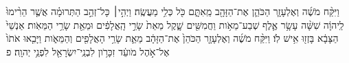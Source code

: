 \documentclass{openreader}
\begin{document}
וַיִּקַּ֨ח מֹשֶׁ֜ה וְאֶלְעָזָ֧ר הַכֹּהֵ֛ן אֶת־הַזָּהָ֖ב מֵֽאִתָּ֑ם כֹּ֖ל כְּלִ֥י מַעֲשֶֽׂה׃ 
וַיְהִ֣י׀ כָּל־זְהַ֣ב הַתְּרוּמָ֗ה אֲשֶׁ֤ר הֵרִ֨ימוּ֙ לַֽיהוָ֔ה שִׁשָּׁ֨ה עָשָׂ֥ר אֶ֛לֶף שְׁבַע־מֵאֹ֥ות וַחֲמִשִּׁ֖ים שָׁ֑קֶל מֵאֵת֙ שָׂרֵ֣י הָֽאֲלָפִ֔ים וּמֵאֵ֖ת שָׂרֵ֥י הַמֵּאֹֽות׃ 
אַנְשֵׁי֙ הַצָּבָ֔א בָּזְז֖וּ אִ֥ישׁ לֹֽו׃ 
וַיִּקַּ֨ח מֹשֶׁ֜ה וְאֶלְעָזָ֤ר הַכֹּהֵן֙ אֶת־הַזָּהָ֔ב מֵאֵ֛ת שָׂרֵ֥י הָאֲלָפִ֖ים וְהַמֵּאֹ֑ות וַיָּבִ֤אוּ אֹתֹו֙ אֶל־אֹ֣הֶל מֹועֵ֔ד זִכָּרֹ֥ון לִבְנֵֽי־יִשְׂרָאֵ֖ל לִפְנֵ֥י יְהוָֽה׃ פ 
\end{document}
